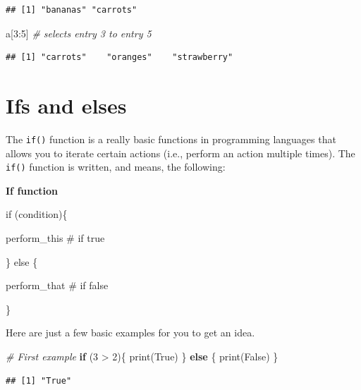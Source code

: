\documentclass[
]{book}
\newenvironment{Shaded}{\begin{snugshade}}{\end{snugshade}}
\newcommand{\CommentTok}[1]{\textcolor[rgb]{0.56,0.35,0.01}{\textit{#1}}}
\newcommand{\ControlFlowTok}[1]{\textcolor[rgb]{0.13,0.29,0.53}{\textbf{#1}}}
\newcommand{\DecValTok}[1]{\textcolor[rgb]{0.00,0.00,0.81}{#1}}
\newcommand{\FunctionTok}[1]{\textcolor[rgb]{0.00,0.00,0.00}{#1}}
\newcommand{\NormalTok}[1]{#1}
\newcommand{\SpecialCharTok}[1]{\textcolor[rgb]{0.00,0.00,0.00}{#1}}
\newcommand{\StringTok}[1]{\textcolor[rgb]{0.31,0.60,0.02}{#1}}
\begin{document}
\begin{verbatim}
## [1] "bananas" "carrots"
\end{verbatim}

\begin{Shaded}
\begin{Highlighting}[]
\NormalTok{a[}\DecValTok{3}\SpecialCharTok{:}\DecValTok{5}\NormalTok{]  }\CommentTok{\# selects entry 3 to entry 5}
\end{Highlighting}
\end{Shaded}

\begin{verbatim}
## [1] "carrots"    "oranges"    "strawberry"
\end{verbatim}

\hypertarget{ifs-and-elses}{%
\section{Ifs and elses}\label{ifs-and-elses}}

The \texttt{if()} function is a really basic functions in programming languages that allows you to iterate certain actions (i.e., perform an action multiple times).
The \texttt{if()} function is written, and means, the following:

\textbf{If function}

if (condition)\{

perform\_this \# if true

\} else \{

perform\_that \# if false

\}

Here are just a few basic examples for you to get an idea.

\begin{Shaded}
\begin{Highlighting}[]
\CommentTok{\# First example}
\ControlFlowTok{if}\NormalTok{ (}\DecValTok{3} \SpecialCharTok{\textgreater{}} \DecValTok{2}\NormalTok{)\{}
  \FunctionTok{print}\NormalTok{(}\StringTok{\textquotesingle{}True\textquotesingle{}}\NormalTok{)}
\NormalTok{\} }\ControlFlowTok{else}\NormalTok{ \{}
  \FunctionTok{print}\NormalTok{(}\StringTok{\textquotesingle{}False\textquotesingle{}}\NormalTok{)}
\NormalTok{\}}
\end{Highlighting}
\end{Shaded}

\begin{verbatim}
## [1] "True"
\end{verbatim}
\end{document}
